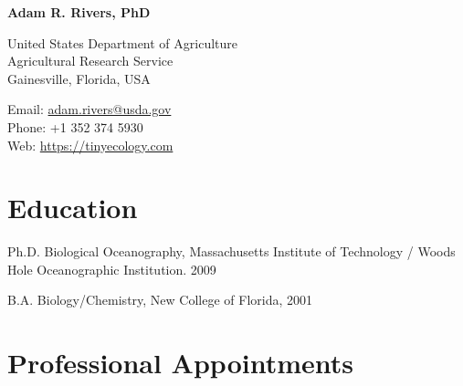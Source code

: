 \documentclass[12pt,letterpaper]{report}
\newcommand{\myname}{Adam R. Rivers, PhD}
\newcommand{\namefont}[1]{{\normalfont\bfseries\Huge{#1}}}
\begin{document}
    \raggedright

    \namefont{\myname}

    \vspace{1em}
    \begin{minipage}[t]{0.68\textwidth}
        United States Department of Agriculture \\
        Agricultural Research Service\\
        Gainesville, Florida, USA
    \end{minipage}
    \begin{minipage}[t]{0.31\textwidth}
        Email: \href{mailto:adam.rivers@usda.gov}{adam.rivers@usda.gov} \\
        Phone: +1 352 374 5930\\
        Web: \href{https://tinyecology.com/}{https://tinyecology.com}
    \end{minipage}
    \vspace{0.5em}



    \section*{Education}

    \begin{tablist}

        \item[Ph.D.] \tab Biological Oceanography, Massachusetts Institute of Technology / Woods Hole Oceanographic Institution. 2009

        \item[B.A.]  \tab Biology/Chemistry, New College of Florida, 2001

    \end{tablist}



    \section*{Professional Appointments}
\end{document}
